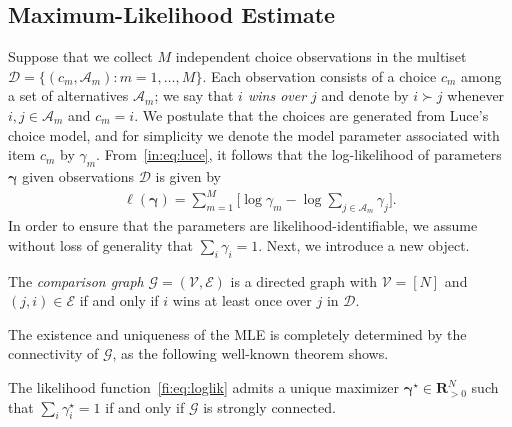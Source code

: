 \subsection{Maximum-Likelihood Estimate}


Suppose that we collect $M$ independent choice observations in the multiset $\mathcal{D} = \{(c_m, \mathcal{A}_m) : m = 1, \ldots, M\}$.
Each observation consists of a choice $c_m$ among a set of alternatives $\mathcal{A}_m$;
we say that \emph{$i$ wins over $j$} and denote by $i \succ j$ whenever $i, j \in \mathcal{A}_m$ and $c_m = i$.
We postulate that the choices are generated from Luce's choice model, and for simplicity we denote the model parameter associated with item $c_m$ by $\gamma_m$.
From~\eqref{in:eq:luce}, it follows that the log-likelihood of parameters $\bm{\gamma}$ given observations $\mathcal{D}$ is given by
\begin{align}
\label{fi:eq:loglik}
\ell(\bm{\gamma}) = \sum_{m = 1}^M \bigg[ \log \gamma_m - \log{\sum_{j \in \mathcal{A}_m} \gamma_j} \bigg].
\end{align}
In order to ensure that the parameters are likelihood-identifiable, we assume without loss of generality that $\sum_i \gamma_i = 1$.
Next, we introduce a new object.

\begin{definition}
The \emph{comparison graph} $\mathcal{G} = (\mathcal{V}, \mathcal{E})$ is a directed graph with $\mathcal{V} = [N]$ and $(j, i) \in \mathcal{E}$ if and only if $i$ wins at least once over $j$ in $\mathcal{D}$.
\end{definition}

The existence and uniqueness of the MLE is completely determined by the connectivity of $\mathcal{G}$, as the following well-known theorem shows.

\begin{theorem}
The likelihood function~\eqref{fi:eq:loglik} admits a unique maximizer $\bm{\gamma}^\star \in \mathbf{R}^N_{>0}$ such that $\sum_i \gamma^\star_i = 1$ if and only if $\mathcal{G}$ is strongly connected.
\end{theorem}

